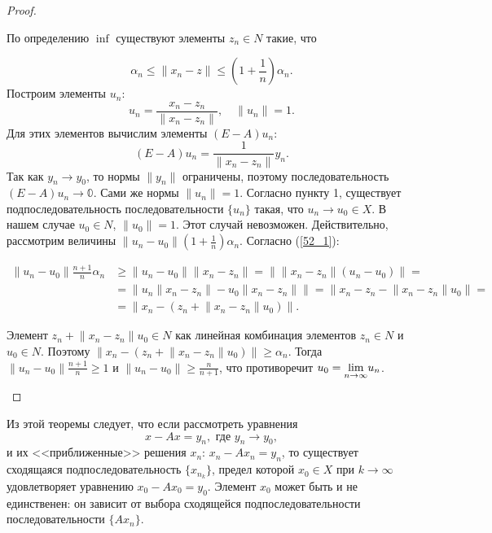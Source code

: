 \documentclass[12pt,a4paper,titlepage,oneside]{book}
\theoremstyle{definition}
\theoremstyle{plain}
\theoremstyle{break}
\theoremstyle{remark}
\theoremstyle{remark}
\theoremstyle{remark}
\theoremstyle{remark}
\theoremstyle{plain}
\theoremstyle{plain}
\begin{document}
\begin{proof}
\begin{enumerate}
	По определению $\inf$ существуют элементы $z_n \in N$ такие, что 
	
\begin{equation}
\label{52_1}
\alpha_n \leqslant \lVert x_n-z \rVert \leqslant (1+\frac{1}{n})\alpha_n.
\end{equation}	
Построим элементы $u_n$: 
$$ u_n = \frac{x_n - z_n}{\lVert x_n - z_n \rVert}, \quad \lVert u_n \rVert = 1.$$
Для этих элементов вычислим элементы $(E-A)u_n$:
\begin{equation*}
(E-A)u_n=\frac{1}{\lVert x_n-z_n \rVert}y_n.
\end{equation*}	
Так как $y_n \to y_0$, то нормы $\lVert y_n \rVert$ ограничены, поэтому последовательность $(E-A)u_n \to \mathbb{0}$. Сами же нормы $\lVert u_n \rVert=1$. Согласно пункту 1, существует подпоследовательность последовательности $\{u_n\}$ такая, что $u_n \to u_0 \in X$. В нашем случае $u_0 \in N$, $\lVert u_0 \rVert=1$. Этот случай невозможен. Действительно, рассмотрим величины $\lVert u_n-u_0 \rVert(1+ \frac{1}{n})\alpha_n$. Согласно (\ref{52_1}):

\begin{align*}
\lVert u_n-u_0 \rVert \frac{n+1}{n} \alpha_n &\geqslant \lVert u_n-u_0 \rVert\lVert x_n-z_n \rVert = \lVert \lVert x_n-z_n \rVert(u_n-u_0) \rVert=\\
&=\lVert u_n\lVert x_n-z_n \rVert-u_0\lVert x_n-z_n \rVert \rVert=\lVert x_n-z_n-\lVert x_n-z_n \rVert u_0 \rVert =\\
&= \lVert x_n-(z_n+\lVert x_n-z_n \rVert u_0) \rVert.
\end{align*}

Элемент $z_n+\lVert x_n-z_n \rVert u_0 \in N$ как линейная комбинация элементов $z_n \in N$ и $u_0 \in N$. Поэтому $\big\lVert x_n-(z_n+\lVert x_n-z_n \rVert u_0) \big\rVert \geqslant \alpha_n$. Тогда $\lVert u_n-u_0 \rVert \frac{n+1}{n} \geqslant 1$ и $\lVert u_n-u_0 \rVert \geqslant\frac{n}{n+1}$, что противоречит $u_0= \smash{\displaystyle\lim_{n \to \infty}}u_n$.
\qedhere
\end{enumerate}
\end{proof}
	
	Из этой теоремы следует, что если рассмотреть уравнения 
	\begin{equation*}
	x-Ax=y_n, \mbox{ где } y_n \to y_0,
	\end{equation*}	
и их <<приближенные>> решения $x_n$: $x_n-Ax_n=y_n$, то существует сходящаяся подпоследовательность $\{x_{n_k}\}$, предел которой $x_0 \in X$ при $k \to \infty$ удовлетворяет уравнению $x_0-Ax_0=y_0$. Элемент $x_0$ может быть и не единственен: он зависит от выбора сходящейся подпоследовательности последовательности $\{Ax_n\}$.
\end{document}
